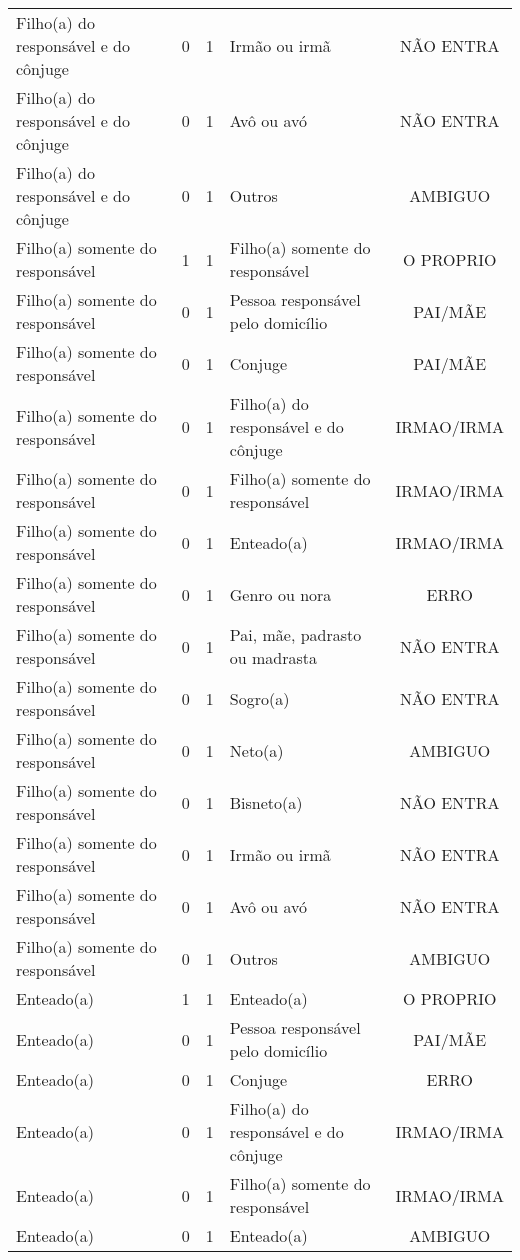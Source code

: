 \documentclass[
	12pt,				%
	openright,			%
	twoside,			%
	a4paper,			%
	english,			%
	french,				%
	spanish,			%
	brazil				%
	]{abntex2}
\begin{document}
\begin{anexosenv}
\begin{longtable}{@{}lcclc@{}}
				Filho(a) do responsável e do cônjuge & 0 & 1 & Irmão ou irmã & NÃO ENTRA \\
				Filho(a) do responsável e do cônjuge & 0 & 1 & Avô ou avó & NÃO ENTRA \\
				Filho(a) do responsável e do cônjuge & 0 & 1 & Outros & AMBIGUO \\
				Filho(a) somente do responsável & 1 & 1 & Filho(a) somente do responsável & O PROPRIO \\
				Filho(a) somente do responsável & 0 & 1 & Pessoa responsável pelo domicílio & PAI/MÃE \\
				Filho(a) somente do responsável & 0 & 1 & Conjuge & PAI/MÃE \\
				Filho(a) somente do responsável & 0 & 1 & Filho(a) do responsável e do cônjuge & IRMAO/IRMA \\
				Filho(a) somente do responsável & 0 & 1 & Filho(a) somente do responsável & IRMAO/IRMA \\
				Filho(a) somente do responsável & 0 & 1 & Enteado(a) & IRMAO/IRMA \\
				Filho(a) somente do responsável & 0 & 1 & Genro ou nora & ERRO \\
				Filho(a) somente do responsável & 0 & 1 & Pai, mãe, padrasto ou madrasta & NÃO ENTRA \\
				Filho(a) somente do responsável & 0 & 1 & Sogro(a) & NÃO ENTRA \\
				Filho(a) somente do responsável & 0 & 1 & Neto(a) & AMBIGUO \\
				Filho(a) somente do responsável & 0 & 1 & Bisneto(a) & NÃO ENTRA \\
				Filho(a) somente do responsável & 0 & 1 & Irmão ou irmã & NÃO ENTRA \\
				Filho(a) somente do responsável & 0 & 1 & Avô ou avó & NÃO ENTRA \\
				Filho(a) somente do responsável & 0 & 1 & Outros & AMBIGUO \\
				Enteado(a) & 1 & 1 & Enteado(a) & O PROPRIO \\
				Enteado(a) & 0 & 1 & Pessoa responsável pelo domicílio & PAI/MÃE \\
				Enteado(a) & 0 & 1 & Conjuge & ERRO \\
				Enteado(a) & 0 & 1 & Filho(a) do responsável e do cônjuge & IRMAO/IRMA \\
				Enteado(a) & 0 & 1 & Filho(a) somente do responsável & IRMAO/IRMA \\
				Enteado(a) & 0 & 1 & Enteado(a) & AMBIGUO \\

\end{longtable}
\end{anexosenv}
\end{document}
